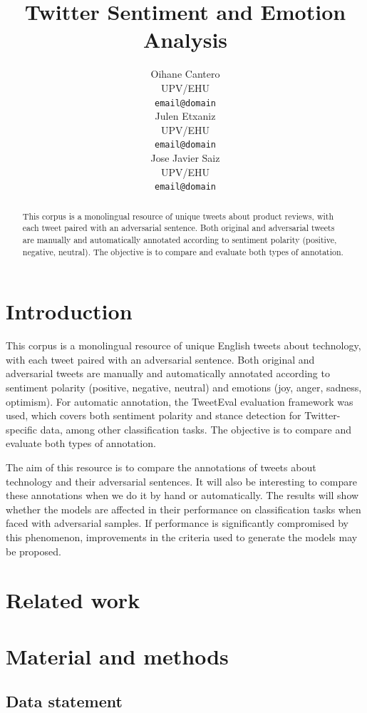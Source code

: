 \documentclass[11pt,a4paper]{article}
\title{Twitter Sentiment and Emotion Analysis}
\author{Oihane Cantero \\
  UPV/EHU \\
  \texttt{email@domain} \\\And
  Julen Etxaniz \\
  UPV/EHU \\
  \texttt{email@domain} \\\And
  Jose Javier Saiz \\
  UPV/EHU \\
  \texttt{email@domain} \\}
\date{}
\begin{document}
\maketitle
\begin{abstract}
This corpus is a monolingual resource of unique tweets about product reviews, with each tweet paired with an adversarial sentence. Both original and adversarial tweets are manually and automatically annotated according to sentiment polarity (positive, negative, neutral). The objective is to compare and evaluate both types of annotation.
\end{abstract}

\section{Introduction}

This corpus is a monolingual resource of unique English tweets about technology, with each tweet paired with an adversarial sentence. Both original and adversarial tweets are manually and automatically annotated according to sentiment polarity (positive, negative, neutral) and emotions (joy, anger, sadness, optimism). For automatic annotation, the TweetEval \cite{barbieri-etal-2020-tweeteval} evaluation framework  was used, which covers both sentiment polarity and stance detection for Twitter-specific data, among other classification tasks. The objective is to compare and evaluate both types of annotation.

The aim of this resource is to compare the annotations of tweets about technology and their adversarial sentences. It will also be interesting to compare these annotations when we do it by hand or automatically. The results will show whether the models are affected in their performance on classification tasks when faced with adversarial samples. If performance is significantly compromised by this phenomenon, improvements in the criteria used to generate the models may be proposed.

\section{Related work}

\section{Material and methods}

\subsection{Data statement}
\end{document}
